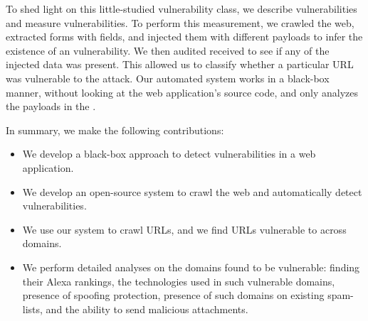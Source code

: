 To shed light on this little-studied vulnerability class, we describe
\ehi vulnerabilities and measure \ehi vulnerabilities. To perform this
measurement, we crawled the web, extracted forms with \email fields,
and injected them with different payloads to infer the existence of an
\ehi vulnerability. We then audited received \emails to see if any of
the injected data was present. This allowed us to classify whether a
particular URL was vulnerable to the attack. Our automated system
works in a black-box manner, without looking at the web application's
source code, and only analyzes the payloads in the \emails.

In summary, we make the following contributions:
\begin{itemize}

\item We develop a black-box approach to detect \ehi vulnerabilities in a web application.

\item We develop an open-source system to crawl the web and automatically detect \ehi vulnerabilities.

\item We use our system to crawl \urls URLs, and we find \success URLs vulnerable to \ehi across \domains domains. 

\item We perform detailed analyses on the domains found to be vulnerable: finding their Alexa rankings, the technologies used in such vulnerable domains, presence of \email spoofing protection, presence of such domains on existing spam-lists, and the ability to send malicious attachments.

\end{itemize}
